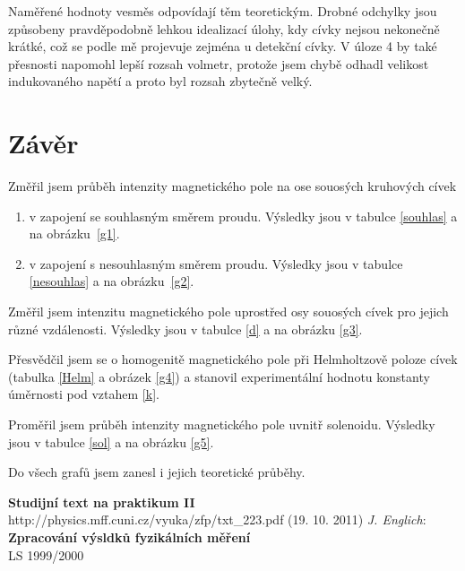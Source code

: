 \documentclass[a4paper,12pt]{article}
\begin{document}
Naměřené hodnoty vesměs odpovídají těm teoretickým. Drobné odchylky jsou způsobeny pravděpodobně lehkou idealizací úlohy, kdy cívky nejsou 
nekonečně krátké, což se podle mě projevuje zejména u detekční cívky. V úloze 4 by také přesnosti napomohl lepší rozsah volmetr, protože jsem 
chybě odhadl velikost indukovaného napětí a proto byl rozsah zbytečně velký.

\section{Závěr}
\noindent
Změřil jsem průběh intenzity magnetického pole na ose souosých kruhových cívek
    \begin{enumerate}
    \item v zapojení se souhlasným směrem proudu. Výsledky jsou v tabulce \ref{souhlas} a na obrázku~\ref{g1}.
    \item v zapojení s nesouhlasným směrem proudu. Výsledky jsou v tabulce \ref{nesouhlas} a na obrázku~\ref{g2}.
    \end{enumerate}

Změřil jsem intenzitu magnetického pole uprostřed osy souosých cívek pro jejich různé vzdálenosti. Výsledky jsou v tabulce \ref{d} a na obrázku \ref{g3}.

Přesvědčil jsem se o homogenitě magnetického pole při Helmholtzově poloze cívek (tabulka \ref{Helm} a obrázek \ref{g4}) a stanovil experimentální hodnotu konstanty úměrnosti pod vztahem \ref{k}.

Proměřil jsem průběh intenzity magnetického pole uvnitř solenoidu. Výsledky jsou v tabulce \ref{sol} a na obrázku \ref{g5}. 

Do všech grafů jsem zanesl i jejich teoretické průběhy.

\begin{thebibliography}{5}
	 \textbf{Studijní text na praktikum II} \\http://physics.mff.cuni.cz/vyuka/zfp/txt\_223.pdf (19. 10. 2011)
     \emph{J. Englich}: \textbf{Zpracování výsldků fyzikálních měření} \\ LS 1999/2000
\end{thebibliography}
\end{document}
